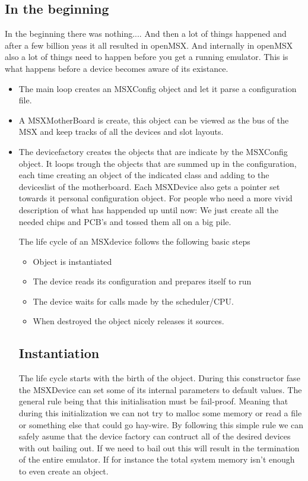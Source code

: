 \documentclass[11pt, a4paper]{report}
\begin{document}
\subsection{In the beginning}
In the beginning there was nothing....
And then a lot of things happened and after a few billion yeas it all resulted in openMSX. And internally in openMSX also a lot of things need to happen before you get a running emulator.
This is what happens before a device becomes aware of its existance.
\begin{itemize}
\item The main loop creates an MSXConfig object and let it parse a configuration file.
\item A MSXMotherBoard is create, this object can be viewed as the bus of the MSX and keep tracks of all the devices and slot layouts.
\item The devicefactory creates the objects that are indicate by the MSXConfig object. It loops trough the objects that are summed up in the configuration, each time creating an object of the indicated class and adding to the deviceslist of the motherboard. Each MSXDevice also gets a pointer set towards it personal configuration object. For people who need a more vivid description of what has happended up until now: We just create all the needed chips and PCB's and tossed them all on a big pile.


The life cycle of an MSXdevice follows the following basic steps
\begin{itemize}
\item Object is instantiated
\item The device reads its configuration and prepares itself to run
\item The device waits for calls made by the scheduler/CPU.
\item When destroyed the object nicely releases it sources.
\end{itemize}

\subsection{Instantiation}
The life cycle starts with the birth of the object.
During this constructor fase the MSXDevice can set some of its internal parameters to default values. The general rule being that this initialisation must be fail-proof. Meaning that during this initialization we can not try to malloc some memory or read a file or something else that could go hay-wire. By following this simple rule we can safely asume that the device factory can contruct all of the desired devices with out bailing out.
If we need to bail out this will result in the termination of the entire emulator. If for instance the total system memory isn't enough to even create an object.


\end{itemize}
\end{document}
